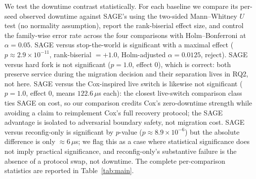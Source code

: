 \documentclass[journal]{IEEEtran}
\theoremstyle{definition}
\theoremstyle{remark}
\begin{document}
We test the downtime contrast statistically. For each baseline we compare its per-seed observed
downtime against SAGE's using the two-sided Mann--Whitney $U$ test (no normality assumption),
report the rank-biserial effect size, and control the family-wise error rate across the four
comparisons with Holm--Bonferroni at $\alpha=0.05$. SAGE versus stop-the-world is significant
with a maximal effect ($p\approx 2.9\times10^{-11}$, rank-biserial $=+1.0$, Holm-adjusted
$\alpha=0.0125$, reject). SAGE versus hard fork is not significant ($p=1.0$, effect $0$), which
is correct: both preserve service during the migration decision and their separation lives in RQ2, not here. SAGE versus the
Cox-inspired live switch is likewise not significant ($p=1.0$, effect $0$, means $122.6\,\mu$s
each): the closest live-switch comparison class ties SAGE on cost, so our comparison credits Cox's
zero-downtime strength while avoiding a claim to reimplement Cox's full recovery protocol; the
SAGE advantage is isolated to adversarial boundary safety, not migration cost. SAGE versus
reconfig-only is significant by $p$-value ($p\approx 8.9\times10^{-6}$) but the absolute
difference is only $\approx 6\,\mu$s; we flag this as a case where statistical significance does
not imply practical significance, and reconfig-only's substantive failure is the absence of a
protocol swap, not downtime. The complete per-comparison statistics are reported in
Table~\ref{tab:main}.
\end{document}
